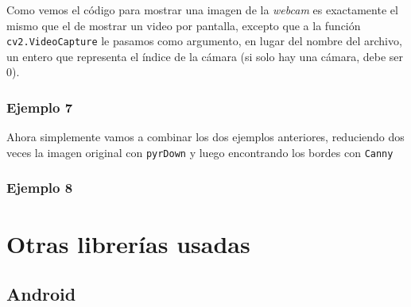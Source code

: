 \documentclass[a4paper,openright, 12pt]{book}
\begin{document}
\newpage

Como vemos el código para mostrar una imagen de la \textit{webcam} es exactamente el mismo que el de mostrar un video por pantalla, excepto que a la función \lstinline|cv2.VideoCapture| le pasamos como argumento, en lugar del nombre del archivo, un entero que representa el índice de la cámara (si solo hay una cámara, debe ser 0).
\newpage

\newpage 
\subsection*{Ejemplo 7}
Ahora simplemente vamos a combinar los dos ejemplos anteriores, reduciendo dos veces la imagen original con \lstinline|pyrDown| y luego encontrando los bordes con \lstinline|Canny|

\newpage

\subsection*{Ejemplo 8}

\newpage
\chapter{Otras librerías usadas}
\section{Android}
\end{document}
